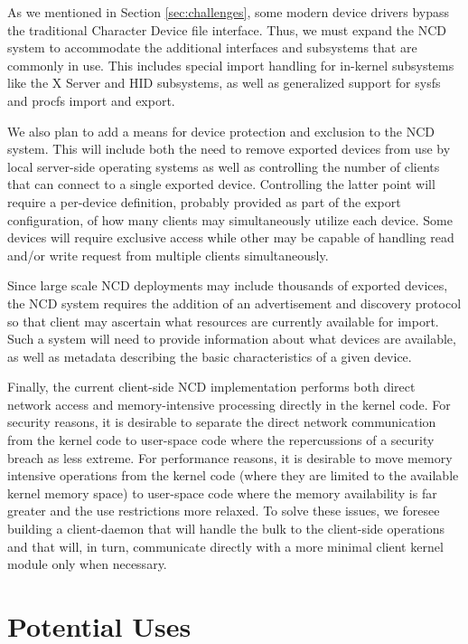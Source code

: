 \documentclass[11pt,twocolumn]{article}
\begin{document}
As we mentioned in Section \ref{sec:challenges}, some modern device
drivers bypass the traditional Character Device file interface. Thus, we
must expand the NCD system to accommodate the additional interfaces and
subsystems that are commonly in use. This includes special import
handling for in-kernel subsystems like the X Server and HID
subsystems, as well as generalized support for sysfs and procfs import
and export.

We also plan to add a means for device protection and exclusion to
the NCD system. This will include both the need to remove exported
devices from use by local server-side operating systems as well as controlling
the number of clients that can connect to a single exported
device. Controlling the latter point will require a per-device
definition, probably provided as part of the export configuration, of
how many clients may simultaneously utilize each device. Some devices will
require exclusive access while other may be capable of handling read
and/or write request from multiple clients simultaneously. 

Since large scale NCD deployments may include thousands of exported
devices, the NCD system requires the addition of an advertisement and
discovery protocol so that client may ascertain what resources are
currently available for import. Such a system will need to provide
information about what devices are available, as well as metadata
describing the basic characteristics of a given device.

Finally, the current client-side NCD implementation performs both direct
network access and memory-intensive processing directly in the kernel
code. For security reasons, it is desirable to separate the direct
network communication from the kernel code to user-space code where
the repercussions of a security breach as less extreme.
For performance reasons, it is desirable to move memory
intensive operations from the kernel code (where they are limited to
the available kernel memory space) to user-space code where the memory
availability is far greater and the use restrictions more relaxed. To
solve these issues, we
foresee building a client-daemon that will handle the bulk to the
client-side operations and that will, in turn, communicate directly with
a more minimal client kernel module only when necessary. 

\section{Potential Uses}
\label{sec:potentialuses}
\end{document}
